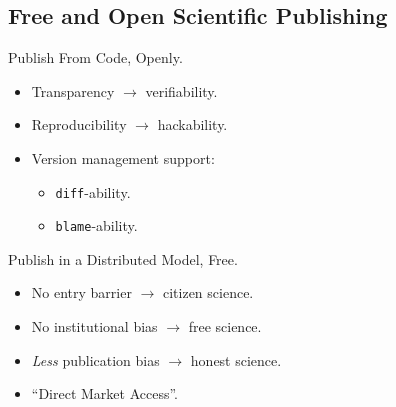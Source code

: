 		\subsection{Free and Open Scientific Publishing}
			\begin{frame}{Publish From Code, Openly.}
				\begin{itemize}
					\item Transparency $\longrightarrow$ verifiability.
					\item Reproducibility $\longrightarrow$ hackability.
					\item Version management support:
					\begin{itemize}
						\item \colorbox{tlg}{\texttt{diff}}-ability.
						\item \colorbox{tlg}{\texttt{blame}}-ability.
					\end{itemize}
				\end{itemize}
			\end{frame}
			\begin{frame}{Publish in a Distributed Model, Free.}
				\begin{itemize}
					\item No entry barrier $\longrightarrow$ citizen science.
					\item No institutional bias $\longrightarrow$ free science.
					\item \textit{Less} publication bias $\longrightarrow$ honest science.
					\item “Direct Market Access”.
				\end{itemize}
			\end{frame}
